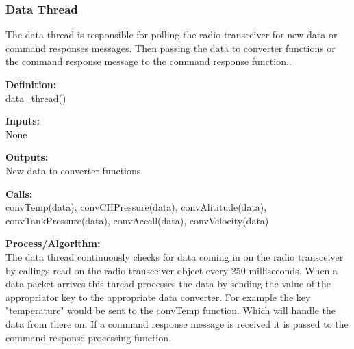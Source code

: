 \documentclass[10pt,draftclsnofoot,onecolumn,compsoc]{IEEEtran}
\begin{document}
\subsubsection{Data Thread}
The data thread is responsible for polling the radio transceiver for new data or command responses messages. Then passing the data to converter functions or the command response message to the command response function.. \par
{\bf Definition:} \\ 
data\_thread() \par
{\bf Inputs:} \\  None \par
{\bf Outputs:} \\ New data to converter functions. \par
{\bf Calls:} \\ convTemp(data), convCHPressure(data), convAlititude(data), convTankPressure(data), convAccell(data), convVelocity(data) \par
{\bf Process/Algorithm:} \\
The data thread continuously checks for data coming in on the radio transceiver by callings read on the radio transceiver object every 250 milliseconds. When a data packet arrives this thread processes the data by sending the value of the appropriator key to the appropriate data converter. For example the key "temperature" would be sent to the convTemp function. Which will handle the data from there on. If a command response message is received it is passed to the command response processing function.  \par
\end{document}

